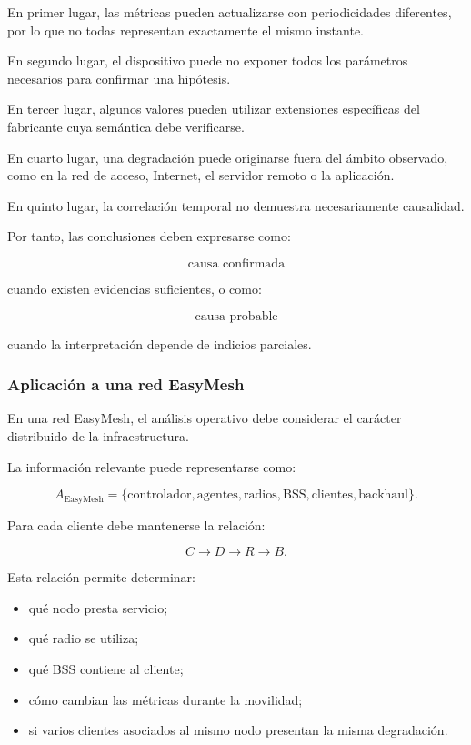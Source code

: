 En primer lugar, las métricas pueden actualizarse con periodicidades
diferentes, por lo que no todas representan exactamente el mismo
instante.

En segundo lugar, el dispositivo puede no exponer todos los parámetros
necesarios para confirmar una hipótesis.

En tercer lugar, algunos valores pueden utilizar extensiones específicas
del fabricante cuya semántica debe verificarse.

En cuarto lugar, una degradación puede originarse fuera del ámbito
observado, como en la red de acceso, Internet, el servidor remoto o la
aplicación.

En quinto lugar, la correlación temporal no demuestra necesariamente
causalidad.

Por tanto, las conclusiones deben expresarse como:

\[
    \text{causa confirmada}
\]

cuando existen evidencias suficientes, o como:

\[
    \text{causa probable}
\]

cuando la interpretación depende de indicios parciales.


\subsubsection*{Aplicación a una red EasyMesh}

En una red EasyMesh, el análisis operativo debe considerar el carácter
distribuido de la infraestructura.

La información relevante puede representarse como:

\[
    A_{\mathrm{EasyMesh}}
    =
    \{
        \text{controlador},
        \text{agentes},
        \text{radios},
        \text{BSS},
        \text{clientes},
        \text{backhaul}
    \}.
\]

Para cada cliente debe mantenerse la relación:

\[
    C
    \longrightarrow
    D
    \longrightarrow
    R
    \longrightarrow
    B.
\]

Esta relación permite determinar:

\begin{itemize}
    \item qué nodo presta servicio;

    \item qué radio se utiliza;

    \item qué BSS contiene al cliente;

    \item cómo cambian las métricas durante la movilidad;

    \item si varios clientes asociados al mismo nodo presentan la misma
    degradación.
\end{itemize}

